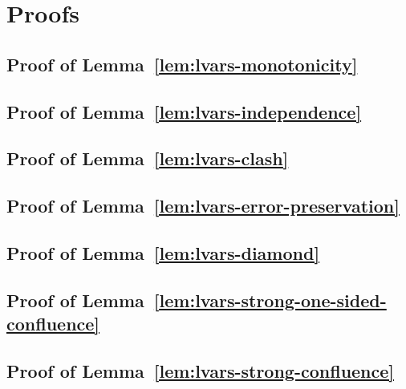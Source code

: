 \chapter{Proofs}\label{app:proofs}

\section{Proof of Lemma~\ref{lem:lvars-monotonicity}}\label{section:lvars-monotonicity-proof}


\section{Proof of Lemma~\ref{lem:lvars-independence}}\label{section:lvars-independence-proof}


\section{Proof of Lemma~\ref{lem:lvars-clash}}\label{section:lvars-clash-proof}


\section{Proof of Lemma~\ref{lem:lvars-error-preservation}}\label{section:lvars-error-preservation-proof}


\section{Proof of Lemma~\ref{lem:lvars-diamond}}\label{section:lvars-diamond-proof}


\section{Proof of Lemma~\ref{lem:lvars-strong-one-sided-confluence}}\label{section:lvars-strong-one-sided-confluence-proof}


\section{Proof of Lemma~\ref{lem:lvars-strong-confluence}}\label{section:lvars-strong-confluence-proof}


